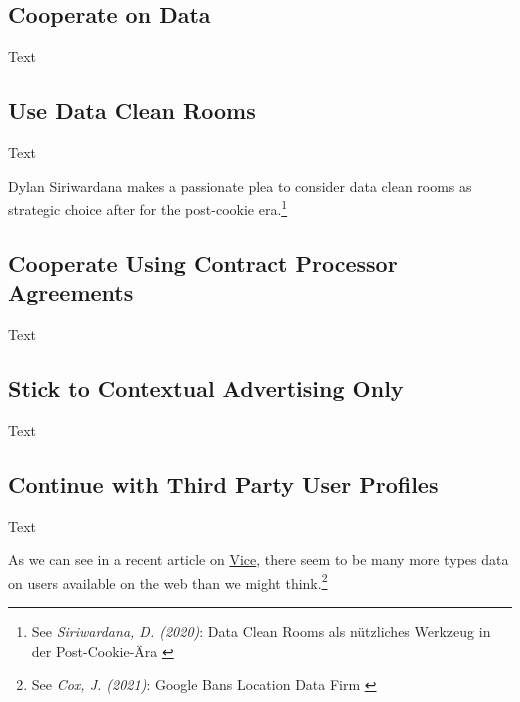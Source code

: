 \subsection{Cooperate on Data}

Text

\subsection{Use Data Clean Rooms}

Text

Dylan Siriwardana makes a passionate plea to consider data clean rooms as strategic choice after for the post-cookie era.\footnote{See \textit{Siriwardana, D. (2020)}: Data Clean Rooms als nützliches Werkzeug in der Post-Cookie-Ära \cite{dataClean}}

\subsection{Cooperate Using Contract Processor Agreements}

Text

\subsection{Stick to Contextual Advertising Only}

Text

\subsection{Continue with Third Party User Profiles}

Text

As we can see in a recent article on \href{https://www.vice.com/en}{Vice}, there seem to be many more types data on users available on the web than we might think.\footnote{See \textit{Cox, J. (2021)}: Google Bans Location Data Firm \cite{dataClean}}
